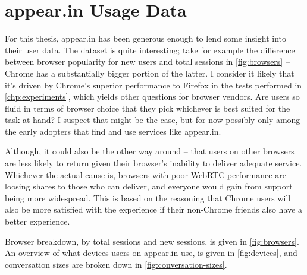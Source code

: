 \chapter{appear.in Usage Data}\label{chp:appear.in-usage}

For this thesis, appear.in has been generous enough to lend some insight into their user data. The dataset is quite interesting; take for example the difference between browser popularity for new users and total sessions in \autoref{fig:browsers} -- Chrome has a substantially bigger portion of the latter. I consider it likely that it's driven by Chrome's superior performance to Firefox in the tests performed in \autoref{chp:experiments}, which yields other questions for browser vendors. Are users so fluid in terms of browser choice that they pick whichever is best suited for the task at hand? I suspect that might be the case, but for now possibly only among the early adopters that find and use services like appear.in.

Although, it could also be the other way around -- that users on other browsers are less likely to return given their browser's inability to deliver adequate service. Whichever the actual cause is, browsers with poor WebRTC performance are loosing shares to those who can deliver, and everyone would gain from support being more widespread. This is based on the reasoning that Chrome users will also be more satisfied with the experience if their non-Chrome friends also have a better experience.

Browser breakdown, by total sessions and new sessions, is given in \autoref{fig:browsers}. An overview of what devices users on appear.in use, is given in \autoref{fig:devices}, and conversation sizes are broken down in \autoref{fig:conversation-sizes}.

